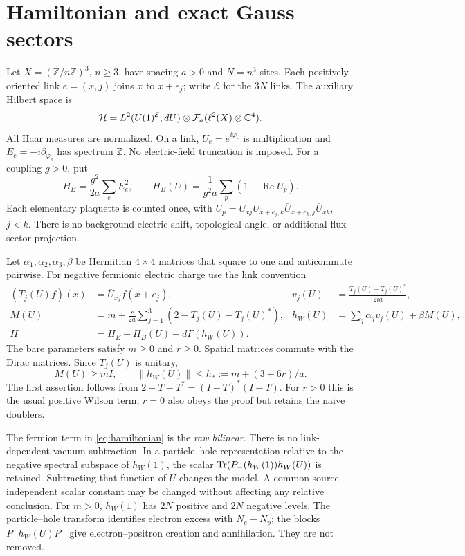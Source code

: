 \section{Hamiltonian and exact Gauss sectors}
\label{sec:model}

Let $X=(\mathbb Z/n\mathbb Z)^3$, $n\ge3$, have spacing $a>0$ and
$N=n^3$ sites. Each positively oriented link $e=(x,j)$ joins $x$
to $x+e_j$; write $\mathcal E$ for the $3N$ links. The auxiliary
Hilbert space is
\begin{equation}
 \mathcal H=L^2(U(1)^{\mathcal E},dU)
       \otimes\mathcal F_a(\ell^2(X)\otimes\mathbb C^4).
 \label{eq:hilbert}
\end{equation}
All Haar measures are normalized. On a link, $U_e=e^{i\varphi_e}$
is multiplication and $E_e=-i\partial_{\varphi_e}$ has spectrum
$\mathbb Z$. No electric-field truncation is imposed.
For a coupling $g>0$, put
\begin{equation}
 H_E=\frac{g^2}{2a}\sum_eE_e^2,\qquad
 H_B(U)=\frac1{g^2a}\sum_p(1-\operatorname{Re}U_p).
 \label{eq:gauge}
\end{equation}
Each elementary plaquette is counted once, with
$U_p=U_{xj}U_{x+e_j,k}\overline U_{x+e_k,j}\overline U_{xk}$,
$j<k$. There is no background electric shift, topological angle,
or additional flux-sector projection.

Let $\alpha_1,\alpha_2,\alpha_3,\beta$ be Hermitian $4\times4$
matrices that square to one and anticommute pairwise. For negative
fermionic electric charge use the link convention
\begin{align}
 (T_j(U)f)(x)&=\overline U_{xj}f(x+e_j),&
 v_j(U)&=\frac{T_j(U)-T_j(U)^*}{2ia},\nonumber\\
 M(U)&=m+\frac r{2a}\sum_{j=1}^3(2-T_j(U)-T_j(U)^*),&
 h_W(U)&=\sum_j\alpha_jv_j(U)+\beta M(U),
 \label{eq:wilson}\\
 H&=H_E+H_B(U)+d\Gamma(h_W(U)).&&
 \label{eq:hamiltonian}
\end{align}
The bare parameters satisfy $m\ge0$ and $r\ge0$. Spatial matrices
commute with the Dirac matrices. Since $T_j(U)$ is unitary,
\begin{equation}
 M(U)\ge mI,\qquad
 \|h_W(U)\|\le h_*:=m+(3+6r)/a.
 \label{eq:mass-bound}
\end{equation}
The first assertion follows from $2-T-T^*=(I-T)^*(I-T)$.
For $r>0$ this is the usual positive Wilson term; $r=0$ also obeys
the proof but retains the naive doublers.

The fermion term in \eqref{eq:hamiltonian} is the \emph{raw bilinear}.
There is no link-dependent vacuum subtraction. In a particle--hole
representation relative to the negative spectral subspace of
$h_W(1)$, the scalar $\operatorname{Tr}(P_-(h_W(1))h_W(U))$ is retained.
Subtracting that function of $U$ changes the model. A common
source-independent scalar constant may be changed without affecting
any relative conclusion.
For $m>0$, $h_W(1)$ has $2N$ positive and $2N$ negative levels.
The particle--hole transform identifies electron excess with
$N_e-N_p$; the blocks $P_+h_W(U)P_-$ give electron--positron
creation and annihilation. They are not removed.

